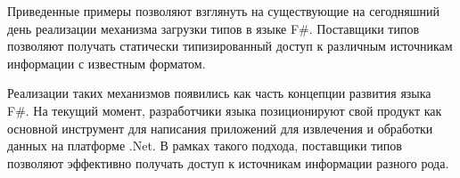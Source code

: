 Приведенные примеры позволяют взглянуть на существующие на сегодняшний день реализации механизма загрузки типов в языке F\#.
Поставщики типов позволяют получать статически типизированный доступ к различным источникам информации с известным форматом.

Реализации таких механизмов появились как часть концепции развития языка F\#.
На текущий момент, разработчики языка позиционируют свой продукт как основной инструмент для написания приложений для извлечения и обработки данных на платформе .Net.
В рамках такого подхода, поставщики типов позволяют эффективно получать доступ к источникам информации разного рода.